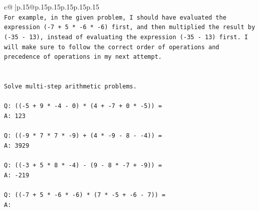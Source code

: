 \documentclass{article}
\begin{document}
{\begin{supertabular}{c@{$\;$}|p{.15\linewidth}@{}p{.15\linewidth}p{.15\linewidth}p{.15\linewidth}p{.15\linewidth}p{.15\linewidth}}
{{{\\ 
\texttt{For example, in the given problem, I should have evaluated the expression ({-}7 + 5 * {-}6 * {-}6) first, and then multiplied the result by ({-}35 {-} 13), instead of evaluating the expression ({-}35 {-} 13) first. I will make sure to follow the correct order of operations and precedence of operations in my next attempt.} \\
\\ 
\\ 
\texttt{Solve multi{-}step arithmetic problems.} \\
\\ 
\texttt{Q: (({-}5 + 9 * {-}4 {-} 0) * (4 + {-}7 + 0 * {-}5)) =} \\
\texttt{A: 123} \\
\\ 
\texttt{Q: (({-}9 * 7 * 7 * {-}9) + (4 * {-}9 {-} 8 {-} {-}4)) =} \\
\texttt{A: 3929} \\
\\ 
\texttt{Q: (({-}3 + 5 * 8 * {-}4) {-} (9 {-} 8 * {-}7 + {-}9)) =} \\
\texttt{A: {-}219} \\
\\ 
\texttt{Q: (({-}7 + 5 * {-}6 * {-}6) * (7 * {-}5 + {-}6 {-} 7)) =} \\
\texttt{A:} \\
            }
        }
    }
     \\ \\


\end{supertabular}}
\end{document}
